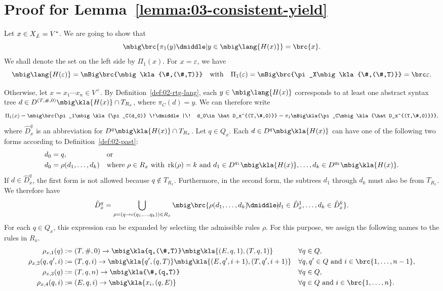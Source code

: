 \section{Proof for Lemma~\ref{lemma:03-consistent-yield}}\label{appendix:03-consistent-yield}

Let $x\in X_{\not\bot} = V^*$. We are going to show that
\[
 \mbig\brc{\pi_1(y) \dmiddle| y\in\mbig\lang{H(x)}} = \brc{x}.
\]
We shall denote the set on the left side by $\Pi_1(x)$. For $x=\varepsilon$, we have
\[
 \mbig\lang{H(\eps)} = \mBig\brc{\mbig\kla{\#,(\#,T)}}
 \quad\text{with}\quad \Pi_1(\eps) = \mBig\brc{\pi_X\mbig\kla{\#,(\#,T)}} = \brc\eps.
\]

Otherwise, let $x = x_1\cdots x_n\in V^+$. By Definition~\ref{def:02-rtg-lang},
each $y\in\mbig\lang{H(x)}$ corresponds to at least one abstract syntax tree
$d\in D^{(T,\#,0)}\mbig\kla{H(x)}\cap T_{R_x}$, where $\pi_C(d) = y$. We can
therefore write
\[
 \Pi_1(x)
 = \mbig\brc{\pi_1\mbig\kla{\pi_C(d_0)} \!\dmiddle|\! d_0\in \hat D_x^{(T,\#,0)}}
 = \pi_1\mBig\kla{\pi_C\mbig\kla{\hat D_x^{(T,\#,0)}}},
\]
where $\hat D_x^q$ is an abbreviation for $D^q\mbig\kla{H(x)}\cap T_{R_x}$. Let
$q\in Q_x$. Each $d\in D^q\mbig\kla{H(x)}$ can have one of the following two
forms according to Definition~\ref{def:02-past}:
\begin{align*}
 d_0 &= q, &&\text{or} \\
 d_0 &= \rho(d_1,\ldots,d_k) &&\text{where~} \rho\in R_x \text{ with } \rk(\rho) = k \text{ and } d_1\in D^{q_1}\mbig\kla{H(x)}, \ldots, d_k\in D^{q_k}\mbig\kla{H(x)}.
\end{align*}
If $d\in \hat D_x^q$, the first form is not allowed because $ q\notin T_{R_x}$.
Furthermore, in the second form, the subtrees $d_1$ through $d_k$ must also be
from $T_{R_x}$. We therefore have
\[
 \hat D_x^q = \bigcup_{\rho=(q\to c(q_1,\ldots,q_k))\in R_x}
 \mbig\brc{\rho(d_1,\ldots,d_k) \!\dmiddle|\! d_1\in\hat D_x^1,\ldots, d_k\in\hat D_x^k}.
\]
For each $q\in Q_x$, this expression can be expanded by selecting the admissible
rules $\rho$. For this purpose, we assign the following names to the rules in $R_x$.
\begin{align*}
 \rho_{x,1}(q) &:= (T,\#,0) \to \mbig\kla{q,(\#,T)}\mbig\kla{(E,q,1),(T,q,1)} &&\forall q\in Q, \\
 \rho_{x,2}(q,q',i) &:= (T,q,i) \to \mbig\kla{q',(q,T)}\mbig\kla{(E,q',i+1),(T,q',i+1)} &&\forall q,q'\in Q \text{ and } i\in\brc{1,\ldots,n-1}, \\
 \rho_{x,3}(q) &:= (T,q,n) \to \mbig\kla{\#,(q,T)} &&\forall q\in Q, \\
 \rho_{x,4}(q,i) &:= (E,q,i) \to \mbig\kla{x_i,(q,E)} &&\forall q\in Q\text{ and } i\in\brc{1,\ldots,n}.
\end{align*}
